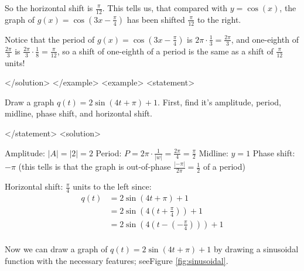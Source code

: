         
          So the horizontal shift is $\frac{\pi}{12}$. This tells us, that compared with $y=\cos(x)$, the graph of $g(x)=\cos(3x-\frac{\pi}{4})$ has been shifted $\frac{\pi}{12}$ to the right.
        
        
          Notice that the period of $g(x)=\cos(3x-\frac{\pi}{4})$ is $2\pi \cdot \frac{1}{3}=\frac{2\pi}{3}$, and one-eighth of $\frac{2\pi}{3}$ is $\frac{2\pi}{3} \cdot \frac{1}{8}=\frac{\pi}{12}$, so a shift of one-eighth of a period is the same as a shift of $\frac{\pi}{12}$ units!
        
      </solution>
    </example>
    <example>
      <statement>
        
          Draw a graph $q(t)=2\sin(4t+\pi)+1$. First, find it's amplitude, period, midline, phase shift, and horizontal shift.
        
      </statement>
      <solution>
        
          Amplitude: $|A|=|2|=2$
          Period: $P=2\pi \cdot \frac{1}{|w|}=\frac{2\pi}{4}=\frac{\pi}{2}$
          Midline: $y=1$
          Phase shift: $-\pi$ (this tells is that the graph is out-of-phase $\frac{|-\pi|}{2\pi}=\frac{1}{2}$ of a period)
        
        
          Horizontal shift: $\frac{\pi}{4}$ units to the left since:
            \begin{align*}
              q(t) &=2\sin\left( 4t+\pi \right)+1\\
               &=2\sin \left(4 \left(t+\frac{\pi}{4} \right)\right)+1\\
               &=2\sin\left( 4 \left(t- \left( -\frac{\pi}{4}\right)\right)\right)+1\\
            \end{align*}
        
          Now we can draw a graph of $q(t)=2\sin(4t+\pi)+1$ by drawing a sinusoidal function with the necessary features; seeFigure \ref{fig:sinusoidal}.
        
        \begin{center}
          \captionsetup{type=figure} 
              \label{fig:sinusoidal}
        \end{center}


